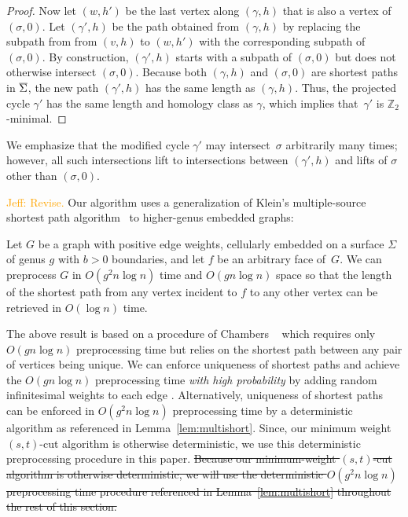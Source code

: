 \documentclass[letterpaper,review]{siamart190516}
\def\Z{\mathbb{Z}}
\def\cycle{\gamma}
\def\Sigmabar{\overline{\smash{\Sigma}\vphantom{t}}}
\def\modified#1{\color{blue}#1 \color{black}}
\def\jnote#1{\textcolor{orange}{Jeff: #1}}
\begin{document}
{\begin{proof}
Now let $(w,h')$ be the last vertex along $(\cycle,h)$ that is also a vertex of $(\sigma,0)$.  Let $(\cycle', h)$ be the path obtained from $(\cycle, h)$ by replacing the subpath from from $(v,h)$ to $(w,h')$ with the corresponding subpath of $(\sigma,0)$.  By construction, $(\cycle', h)$ starts with a subpath of $(\sigma,0)$ but does not otherwise intersect $(\sigma,0)$.   Because both $(\cycle, h)$ and $(\sigma,0)$ are shortest paths in $\Sigmabar$, the new path $(\cycle', h)$ has the same length as $(\cycle, h)$.  Thus, the projected cycle $\cycle'$ has the same length and homology class as $\cycle$, which implies that~$\cycle'$ is $\Z_2$-minimal.
\end{proof}

We emphasize that the modified cycle $\cycle'$ may intersect~$\sigma$ arbitrarily many times; however, all such intersections lift to intersections between $(\cycle', h)$ and lifts of $\sigma$ other than $(\sigma, 0)$.

\jnote{Revise.}
Our algorithm uses a generalization of Klein's  multiple-source shortest path algorithm~\cite{k-msspp-05} to higher-genus embedded graphs:

\begin{lemma}
\label{lem:multishort}
Let $G$ be a graph with positive edge weights, cellularly embedded on a surface $\Sigma$ of
genus $g$ with $b>0$ boundaries, and let $f$ be an arbitrary face of~$G$.
We can preprocess $G$ in $O(g^2n\log n)$ time and $O(g n \log n)$ space so that the length of the
shortest path from any vertex incident to $f$ to any other vertex can be retrieved in $O(\log n)$
time.
\end{lemma}

The above result is based on a procedure of Chambers \etal~\cite{cce-msspe-13} which requires only
$O(g n \log n)$ preprocessing time but relies on the shortest path between any pair of vertices
being unique.
We can enforce uniqueness of shortest paths and achieve the $O(g n \log n)$ preprocessing time
\emph{with high probability} by adding random infinitesimal weights to each edge \cite{mvv-memi-87}.
\modified{Alternatively, uniqueness of shortest paths can be enforced in $O(g^2 n \log n)$ preprocessing time by a deterministic algorithm as referenced in
Lemma~\ref{lem:multishort}. Since, our minimum weight $(s,t)$-cut algorithm is otherwise deterministic, we use this deterministic preprocessing procedure in this paper.}
\sout{Because our minimum-weight $(s,t)$-cut algorithm is otherwise deterministic, we will use the
deterministic $O(g^2 n \log n)$ preprocessing time procedure referenced in
Lemma~\ref{lem:multishort} throughout the rest of this section.}

}
\end{document}
